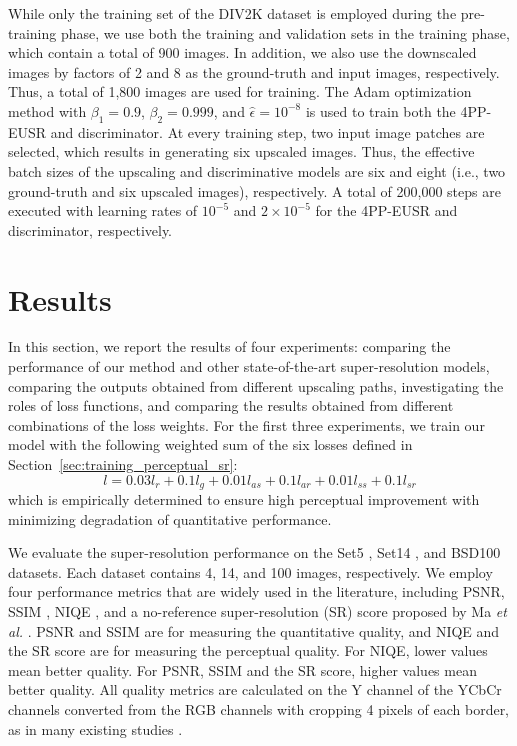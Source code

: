 \documentclass[runningheads]{llncs}
\begin{document}
While only the training set of the DIV2K dataset is employed during the pre-training phase, we use both the training and validation sets in the training phase, which contain a total of 900 images.
In addition, we also use the downscaled images by factors of 2 and 8 as the ground-truth and input images, respectively.
Thus, a total of 1,800 images are used for training.
The Adam optimization method \cite{kingma2014adam} with $\beta_{1}=0.9$, $\beta_{2}=0.999$, and $\hat{\epsilon}={10}^{-8}$ is used to train both the 4PP-EUSR and discriminator.
At every training step, two input image patches are selected, which results in generating six upscaled images.
Thus, the effective batch sizes of the upscaling and discriminative models are six and eight (i.e., two ground-truth and six upscaled images), respectively.
A total of 200,000 steps are executed with learning rates of ${10}^{-5}$ and $2 \times {10}^{-5}$ for the 4PP-EUSR and discriminator, respectively.


\section{Results}
\label{sec:results}

In this section, we report the results of four experiments: comparing the performance of our method and other state-of-the-art super-resolution models, comparing the outputs obtained from different upscaling paths, investigating the roles of loss functions, and comparing the results obtained from different combinations of the loss weights.
For the first three experiments, we train our model with the following weighted sum of the six losses defined in Section~\ref{sec:training_perceptual_sr}:
\begin{equation}
\label{eq:default_loss_equation}
l = 0.03 {l}_{r} + 0.1 {l}_{g} + 0.01 {l}_{as} + 0.1 {l}_{ar} + 0.01 {l}_{ss} + 0.1 {l}_{sr}
\end{equation}
which is empirically determined to ensure high perceptual improvement with minimizing degradation of quantitative performance.

We evaluate the super-resolution performance on the Set5 \cite{bevilacqua2012low}, Set14 \cite{zeyde2010single}, and BSD100 \cite{martin2001database} datasets.
Each dataset contains 4, 14, and 100 images, respectively.
We employ four performance metrics that are widely used in the literature, including PSNR, SSIM \cite{wang2004image}, NIQE \cite{mittal2013making}, and a no-reference super-resolution (SR) score proposed by Ma \textit{et al.} \cite{ma2017learning}.
PSNR and SSIM are for measuring the quantitative quality, and NIQE and the SR score are for measuring the perceptual quality.
For NIQE, lower values mean better quality.
For PSNR, SSIM and the SR score, higher values mean better quality.
All quality metrics are calculated on the Y channel of the YCbCr channels converted from the RGB channels with cropping 4 pixels of each border, as in many existing studies \cite{ledig2017photo,kim2018deep,lim2017enhanced}.
\end{document}
